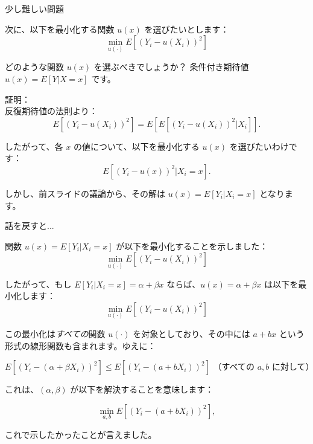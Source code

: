 \documentclass[11pt,handout]{beamer}
\newenvironment{wideitemize}{\itemize\addtolength{\itemsep}{10pt}}{\enditemize}
\begin{document}
\begin{frame}{少し難しい問題}
\vspace{0.2cm}
\begin{wideitemize}

	\item
	次に、以下を最小化する関数 $u(x)$ を選びたいとします：
	$$\min_{u(\cdot)} E[ (Y_i - u(X_i))^2  ]$$
	
	\pause
	\item
	どのような関数 $u(x)$ を選ぶべきでしょうか？ \pause 条件付き期待値 $u(x) = E[Y|X= x]$ です。
	
	\pause
	\item
	証明： \\
	反復期待値の法則より：
	$$E[ (Y_i - u(X_i))^2  ] = E[  E[  (Y_i - u(X_i)) ^2| X_i  ]   ] .$$
	
	\pause
	したがって、各 $x$ の値について、以下を最小化する $u(x)$ を選びたいわけです：
	$$E[ (Y_i - u(x))^2 | X_i = x ].$$ 
	
	\pause しかし、前スライドの議論から、その解は $u(x) = E[Y_i | X_i = x]$ となります。
\end{wideitemize}
\end{frame}

\begin{frame}{話を戻すと...}
	
\begin{wideitemize}

\item
関数 $u(x) = E[Y_i | X_i = x]$ が以下を最小化することを示しました：
$$\min_{u(\cdot)} E[ (Y_i - u(X_i))^2  ]$$

\pause
\item
したがって、もし $E[Y_i | X_i = x] = \alpha + \beta x$ ならば、$u(x) = \alpha + \beta x$ は以下を最小化します：
$$\min_{u(\cdot)} E[ (Y_i - u(X_i))^2  ]$$

\pause
\item
この最小化は\textit{すべての}関数 $u(\cdot)$ を対象としており、その中には $a + b x$ という形式の線形関数も含まれます。ゆえに：

$$ E[ (Y_i -  (\alpha + \beta X_i)  )^2  ] \leq  E[ (Y_i -  (a + b X_i)  )^2  ]  \text{ （すべての } a ,b \text{ に対して）} $$

\pause
\item
これは、$(\alpha,\beta)$ が以下を解決することを意味します：

$$\min_{a,b}E[ (Y_i -  (a+ b X_i)  )^2  ] ,$$

\noindent これで示したかったことが言えました。
\end{wideitemize}	
\end{frame}
\end{document}

